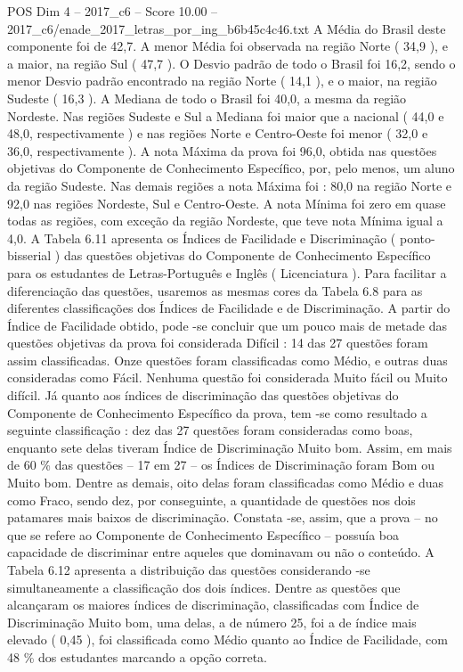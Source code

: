 \begin{textsample}{POS Dim 4 – 2017\_c6 – Score 10.00 – 2017\_c6/enade\_2017\_letras\_por\_ing\_b6b45c4c46.txt}
A Média do Brasil deste componente foi de 42,7.
A menor Média foi observada na região Norte ( 34,9 ), e a maior, na região Sul ( 47,7 ).
O Desvio padrão de todo o Brasil foi 16,2, sendo o menor Desvio padrão encontrado na região Norte ( 14,1 ), e o maior, na região Sudeste ( 16,3 ).
A Mediana de todo o Brasil foi 40,0, a mesma da região Nordeste.
Nas regiões Sudeste e Sul a Mediana foi maior que a nacional ( 44,0 e 48,0, respectivamente ) e nas regiões Norte e Centro-Oeste foi menor ( 32,0 e 36,0, respectivamente ).
A nota Máxima da prova foi 96,0, obtida nas questões objetivas do Componente de Conhecimento Específico, por, pelo menos, um aluno da região Sudeste.
Nas demais regiões a nota Máxima foi : 80,0 na região Norte e 92,0 nas regiões Nordeste, Sul e Centro-Oeste.
A nota Mínima foi zero em quase todas as regiões, com exceção da região Nordeste, que teve nota Mínima igual a 4,0.
A Tabela 6.11 apresenta os Índices de Facilidade e Discriminação ( ponto-bisserial ) das questões objetivas do Componente de Conhecimento Específico para os estudantes de Letras-Português e Inglês ( Licenciatura ).
Para facilitar a diferenciação das questões, usaremos as mesmas cores da Tabela 6.8 para as diferentes classificações dos Índices de Facilidade e de Discriminação.
A partir do Índice de Facilidade obtido, pode -se concluir que um pouco mais de metade das questões objetivas da prova foi considerada Difícil : 14 das 27 questões foram assim classificadas.
Onze questões foram classificadas como Médio, e outras duas consideradas como Fácil.
Nenhuma questão foi considerada Muito fácil ou Muito difícil.
Já quanto aos índices de discriminação das questões objetivas do Componente de Conhecimento Específico da prova, tem -se como resultado a seguinte classificação : dez das 27 questões foram consideradas como boas, enquanto sete delas tiveram Índice de Discriminação Muito bom.
Assim, em mais de 60 \% das questões – 17 em 27 – os Índices de Discriminação foram Bom ou Muito bom.
Dentre as demais, oito delas foram classificadas como Médio e duas como Fraco, sendo dez, por conseguinte, a quantidade de questões nos dois patamares mais baixos de discriminação.
Constata -se, assim, que a prova – no que se refere ao Componente de Conhecimento Específico – possuía boa capacidade de discriminar entre aqueles que dominavam ou não o conteúdo.
A Tabela 6.12 apresenta a distribuição das questões considerando -se simultaneamente a classificação dos dois índices.
Dentre as questões que alcançaram os maiores índices de discriminação, classificadas com Índice de Discriminação Muito bom, uma delas, a de número 25, foi a de índice mais elevado ( 0,45 ), foi classificada como Médio quanto ao Índice de Facilidade, com 48 \% dos estudantes marcando a opção correta.

\end{textsample}
